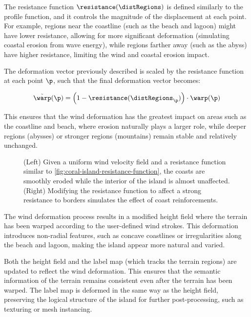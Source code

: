 The resistance function $\resistance(\distRegions)$ is defined similarly to the profile function, and it controls the magnitude of the displacement at each point. For example, regions near the coastline (such as the beach and lagoon) might have lower resistance, allowing for more significant deformation (simulating coastal erosion from wave energy), while regions farther away (such as the abyss) have higher resistance, limiting the wind and coastal erosion impact.

The deformation vector previously described is scaled by the resistance function at each point $\p$, such that the final deformation vector becomes:

\begin{align}
\Tilde{\warp}(\p) = \left(1 - \resistance(\distRegions_\p) \right) \cdot \warp(\p)
\end{align}

This ensures that the wind deformation has the greatest impact on areas such as the coastline and beach, where erosion naturally plays a larger role, while deeper regions (abysses) or stronger regions (mountains) remain stable and relatively unchanged.

\begin{figure}[H]
\caption{(Left) Given a uniform wind velocity field and a resistance function similar to \cref{fig:coral-island-resistance-function}, the coasts are smoothly eroded while the interior of the island is almost unaffected. (Right) Modifying the resistance function to affect a strong resistance to borders simulates the effect of coast reinforcements.}
\end{figure}


The wind deformation process results in a modified height field where the terrain has been warped according to the user-defined wind strokes. This deformation introduces non-radial features, such as concave coastlines or irregularities along the beach and lagoon, making the island appear more natural and varied.

Both the height field and the label map (which tracks the terrain regions) are updated to reflect the wind deformation. This ensures that the semantic information of the terrain remains consistent even after the terrain has been warped. The label map is deformed in the same way as the height field, preserving the logical structure of the island for further post-processing, such as texturing or mesh instancing.

